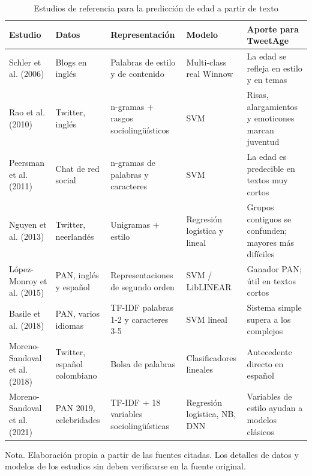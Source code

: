 \documentclass[10pt,twocolumn]{article}
\begin{document}
\begin{table}[!t]
\centering\scriptsize
\caption{Estudios de referencia para la predicción de edad a partir de texto}\label{tab:1}
\renewcommand{\arraystretch}{1.15}
\begin{tabular}{p{}p{}p{}p{}p{}}
\hline
\raggedright\textbf{Estudio} & \raggedright\textbf{Datos} & \raggedright\textbf{Representación} & \raggedright\textbf{Modelo} & \raggedright\textbf{Aporte para TweetAge} \tabularnewline \hline
\raggedright Schler et al. (2006) & \raggedright Blogs en inglés & \raggedright Palabras de estilo y de contenido & \raggedright Multi-class real Winnow & \raggedright La edad se refleja en estilo y en temas \tabularnewline
\raggedright Rao et al. (2010) & \raggedright Twitter, inglés & \raggedright n-gramas + rasgos sociolingüísticos & \raggedright SVM & \raggedright Risas, alargamientos y emoticones marcan juventud \tabularnewline
\raggedright Peersman et al. (2011) & \raggedright Chat de red social & \raggedright n-gramas de palabras y caracteres & \raggedright SVM & \raggedright La edad es predecible en textos muy cortos \tabularnewline
\raggedright Nguyen et al. (2013) & \raggedright Twitter, neerlandés & \raggedright Unigramas + estilo & \raggedright Regresión logística y lineal & \raggedright Grupos contiguos se confunden; mayores más difíciles \tabularnewline
\raggedright López-Monroy et al. (2015) & \raggedright PAN, inglés y español & \raggedright Representaciones de segundo orden & \raggedright SVM / LibLINEAR & \raggedright Ganador PAN; útil en textos cortos \tabularnewline
\raggedright Basile et al. (2018) & \raggedright PAN, varios idiomas & \raggedright TF-IDF palabras 1-2 y caracteres 3-5 & \raggedright SVM lineal & \raggedright Sistema simple supera a los complejos \tabularnewline
\raggedright Moreno-Sandoval et al. (2018) & \raggedright Twitter, español colombiano & \raggedright Bolsa de palabras & \raggedright Clasificadores lineales & \raggedright Antecedente directo en español \tabularnewline
\raggedright Moreno-Sandoval et al. (2021) & \raggedright PAN 2019, celebridades & \raggedright TF-IDF + 18 variables sociolingüísticas & \raggedright Regresión logística, NB, DNN & \raggedright Variables de estilo ayudan a modelos clásicos \tabularnewline
\hline
\end{tabular}
\par\smallskip\raggedright\scriptsize Nota. Elaboración propia a partir de las fuentes citadas. Los detalles de datos y modelos de los estudios sin \textdagger{} deben verificarse en la fuente original.
\end{table}
\end{document}
